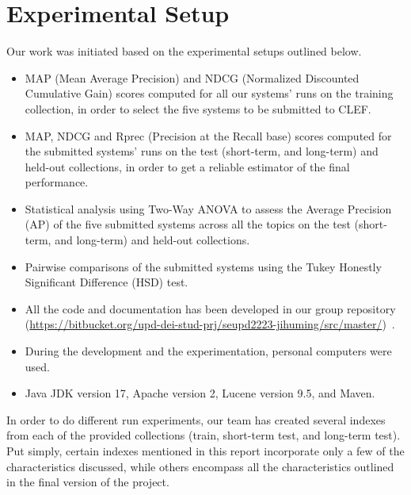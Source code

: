 \section{Experimental Setup}\label{sec:setup}

Our work was initiated based on the experimental setups outlined below.
\begin{itemize}
	\item MAP (Mean Average Precision) and NDCG (Normalized Discounted Cumulative Gain) scores computed for all our
	systems' runs on the training collection, in order to select the five systems to be submitted to CLEF\@.
	\item MAP, NDCG and Rprec (Precision at the Recall
	base) scores computed for the submitted systems' runs on the test (short-term, and long-term) and held-out
	collections, in order to get a reliable estimator of the final performance.
	\item Statistical analysis using Two-Way ANOVA to assess the Average Precision (AP) of the five submitted systems
	across all the topics on the test (short-term, and long-term) and held-out collections.
	\item Pairwise comparisons of the submitted systems using the Tukey Honestly Significant Difference (HSD) test.
	\item All the code and documentation has been developed in our group repository
	(\href{https://bitbucket.org/upd-dei-stud-prj/seupd2223-jihuming/src/master/}{https://bitbucket.org/upd-dei-stud-prj/seupd2223-jihuming/src/master/})~\cite{jihuming}.
	\item During the development and the experimentation, personal computers were used.
	\item Java JDK version 17, Apache version 2, Lucene version 9.5, and Maven.
\end{itemize}

In order to do different run experiments, our team has created several indexes from each of the provided collections
(train, short-term test, and long-term test).
Put simply, certain indexes mentioned in this report incorporate only a few of the characteristics discussed, while
others encompass all the characteristics outlined in the final version of the project.\\

